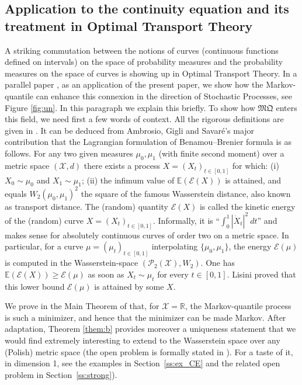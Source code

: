 \documentclass[11pt]{article}
\theoremstyle{plain}
\theoremstyle{definition}
\newcommand{\mq}{\mathfrak{MQ}}
\newcommand{\XX}{{\mathcal X}}
\newcommand{\EE}{{\mathcal E}}
\newcommand{\p}{\mathcal{P}}
\newcommand{\R}{\mathbb{R}}
\newcommand{\E}{\mathbb{E}}
\begin{document}
\subsection{Application to the continuity equation and its treatment in Optimal Transport Theory}\label{subsec:intro_transport}
A striking commutation between the notions of curves (continuous functions defined on intervals) on the space of probability measures and the probability measures on the space of curves is showing up in Optimal Transport Theory. In a parallel paper \cite{BouJui2}, as an application of the present paper, we show how the Markov-quantile can enhance this connexion in the direction of Stochastic Processes, see Figure \ref{fig:un}. In this paragraph we explain this briefly. To show how $\mq$ enters this field, we need first a few words of context. All the rigorous definitions are given in \cite{BouJui2}. It can be deduced from Ambrosio, Gigli and Savaré's major contribution \cite{AGS} that the Lagrangian formulation of Benamou--Brenier formula \cite{BeBr} is as follows. For any two given measures $\mu_0, \mu_1$ (with finite second moment) over a metric space $(\XX,d)$ there exists a process $X=(X_t)_{t\in [0,1]}$ for which: (i) $X_0\sim \mu_0$ and $X_1\sim \mu_1$; (ii) the infimum value of $\E(\EE(X))$ is attained, and equals $W_2(\mu_0,\mu_1)^2$ the square of the famous Wasserstein distance, also known as transport distance. The (random) quantity $\EE(X)$ is called the kinetic energy of the (random) curve $X=(X_t)_{t\in [0,1]}$. Informally, it is ``$\int_0^1 |\dot X_t|^2\ dt$'' and makes sense for absolutely continuous curves of order two on a metric space. In particular, for a curve $\mu=(\mu_t)_{t\in [0,1]}$ interpolating $\{\mu_0,\mu_1\}$, the energy $\EE(\mu)$ is computed in the Wasserstein-space $(\p_2(\XX),W_2)$. One has $\E(\EE(X))\geq \EE(\mu)$ as soon as $X_t\sim \mu_t$ for every $t\in [0,1]$. Lisini proved \cite{Lis} that this lower bound $\EE(\mu)$ is attained by some $X$.

We prove in the Main Theorem of \cite{BouJui2} that, for $\XX=\R$, the Markov-quantile process is such a minimizer, and hence that the minimizer can be made Markov. After adaptation, Theorem \ref{them:b} provides moreover a uniqueness statement that we would find extremely interesting to extend to the Wasserstein space over any (Polish) metric space (the open problem is formally stated in \cite{BouJui2}). For a taste of it, in dimension 1, see the examples in Section~\ref{ss:ex_CE} and the related open problem in Section~\ref{ss:strong}).
\end{document}
